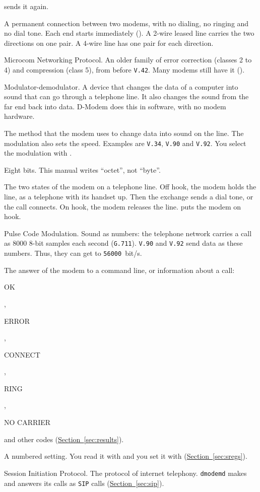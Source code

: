 \documentclass[a5paper,10pt]{article}
\makeatletter
\newcommand{\cmd}[1]{\texttt{#1}}
\DeclareRobustCommand{\rc}[1]{{\setlength{\fboxsep}{1pt}%
  \colorbox{dmrc}{\ttfamily\color{dmnavy}\rule[-0.45ex]{0pt}{1.95ex}#1}}}
\newcommand{\cmdr}[1]{\textcolor{dmlink}{\cmd{#1}}}
\newcommand{\std}[1]{\texttt{#1}}
\newcommand{\stdb}[1]{\textpdfrender{TextRenderingMode=FillStroke,
  LineWidth=0.25pt}{\texttt{#1}}}
\newcommand{\bs}{\textbackslash}
\newcommand{\p}[1]{\textmd{\textit{#1}}}
\newcommand{\cmdl}[2][]{\hyperlink{cmd:#1}{\cmd{#2}}}
\let\cmd\@firstofone
\let\p\@firstofone
\def\bs{\textbackslash}%
\makeatother
\begin{document}
\begin{description}[style=nextline,leftmargin=1.2em,font=\bfseries\color{dmnavy}]
  sends it again.
\item[Leased line] A permanent connection between two modems, with no
  dialing, no ringing and no dial tone.  Each end starts immediately
  (\cmdl[ampL]{\&L}).  A 2-wire leased line carries the two directions
  on one pair.  A 4-wire line has one pair for each direction.
\item[\stdb{MNP}] Microcom Networking Protocol.  An older family of
  error correction (classes 2 to 4) and compression (class 5), from
  before \std{V.42}.  Many modems still have it (\cmdl[bsN]{\bs N}).
\item[Modem] Modulator-demodulator.  A device that changes the data of a
  computer into sound that can go through a telephone line.  It also
  changes the sound from the far end back into data.  D-Modem does this
  in software, with no modem hardware.
\item[Modulation] The method that the modem uses to change data into
  sound on the line.  The modulation also sets the speed.  Examples are
  \std{V.34}, \std{V.90} and \std{V.92}.  You select the modulation
  with \cmdl[plusMS]{+MS}.
\item[Octet] Eight bits.  This manual writes ``octet'', not ``byte''.
\item[On hook and off hook] The two states of the modem on a telephone
  line.  Off hook, the modem holds the line, as a telephone with its
  handset up.  Then the exchange sends a dial tone, or the call connects.
  On hook, the modem releases the line.  \cmdl[H]{ATH0} puts the modem
  on hook.
\item[\stdb{PCM}] Pulse Code Modulation.  Sound as numbers: the telephone
  network carries a call as 8000 8-bit samples each second (\std{G.711}).
  \std{V.90} and \std{V.92} send data as these numbers.  Thus, they can
  get to \std{56000}~bit/s.
\item[Result code] The answer of the modem to a command line, or
  information about a call: \rc{OK}, \rc{ERROR}, \rc{CONNECT}, \rc{RING},
  \rc{NO CARRIER} and other codes
  (\hyperref[sec:results]{Section~\ref*{sec:results}}).
\item[S-register] A numbered setting.  You read it with
  \cmdr{ATS}\p{n}\cmdr{?} and you set it with
  \cmdr{ATS}\p{n}\cmdr{=}\p{value}
  (\hyperref[sec:sregs]{Section~\ref*{sec:sregs}}).
\item[\stdb{SIP}] Session Initiation Protocol.  The protocol of internet
  telephony.  \texttt{dmodemd} makes and answers its calls as \std{SIP}
  calls (\hyperref[sec:sip]{Section~\ref*{sec:sip}}).

\end{description}
\end{document}
